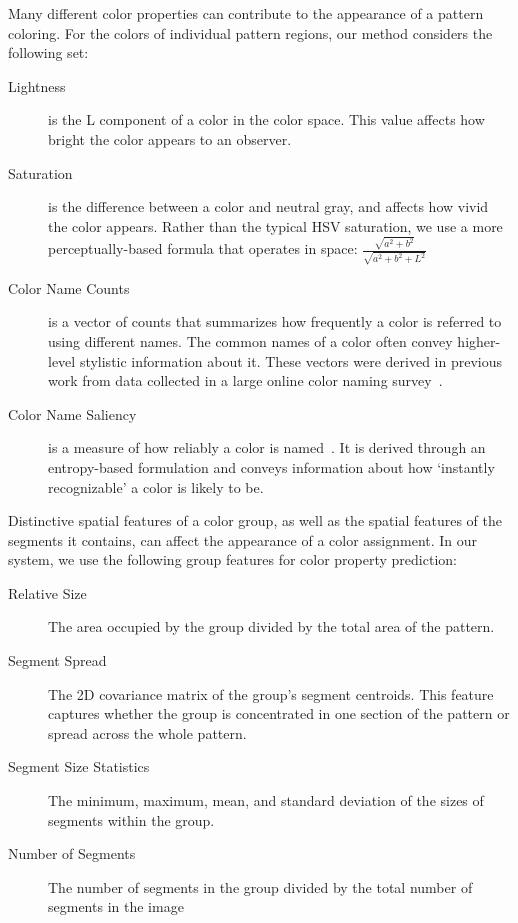 Many different color properties can contribute to the appearance of a pattern coloring. For the colors of individual pattern regions, our method considers the following set:
\begin{description}
	\item[Lightness] is the L component of a color in the \lab color space. This value affects how bright the color appears to an observer.
	\item[Saturation] is the difference between a color and neutral gray, and affects how vivid the color appears. Rather than the typical HSV saturation, we use a more perceptually-based formula that operates in \lab space: $\frac{\sqrt{a^2+b^2}}{\sqrt{a^2+b^2+L^2}}$ ~\cite{ColorfulnessReference}
	\item[Color Name Counts] is a vector of counts that summarizes how frequently a color is referred to using different names. The common names of a color often convey higher-level stylistic information about it. These vectors were derived in previous work from data collected in a large online color naming survey~\cite{ColorNamingModels}.
	\item[Color Name Saliency] is a measure of how reliably a color is named~\cite{ColorNamingModels}. It is derived through an entropy-based formulation and conveys information about how `instantly recognizable' a color is likely to be.
\end{description}
%
%
Distinctive spatial features of a color group, as well as the spatial features of the segments it contains, can affect the appearance of a color assignment. In our system, we use the following group features for color property prediction:
\begin{description}
	\item[Relative Size] The area occupied by the group divided by the total area of the pattern.
  \item[Segment Spread] The 2D covariance matrix of the group's segment centroids. This feature captures whether the group is concentrated in one section of the pattern or spread across the whole pattern.
  \item[Segment Size Statistics] The minimum, maximum, mean, and standard deviation of the sizes of segments within the group.
  \item[Number of Segments] The number of segments in the group divided by the total number of segments in the image
\end{description}
